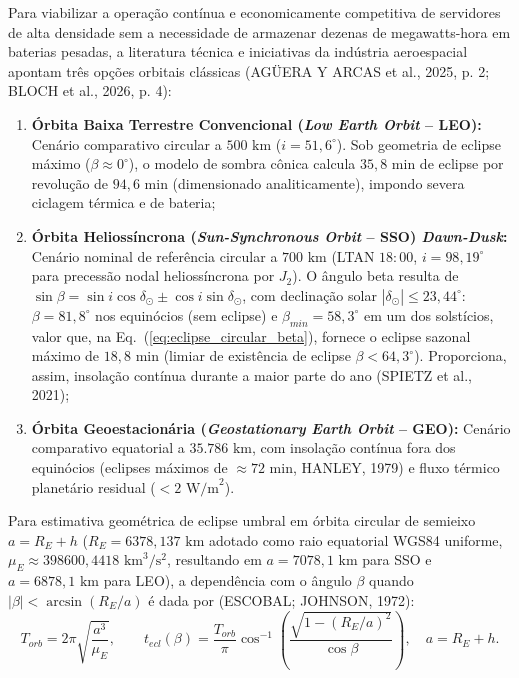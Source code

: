 Para viabilizar a operação contínua e economicamente competitiva de servidores de alta densidade sem a necessidade de armazenar dezenas de megawatts-hora em baterias pesadas, a literatura técnica e iniciativas da indústria aeroespacial apontam três opções orbitais clássicas (AGÜERA Y ARCAS et al., 2025, p. 2; BLOCH et al., 2026, p. 4):
\begin{enumerate}[label=(\alph*)]
    \item \textbf{Órbita Baixa Terrestre Convencional (\textit{Low Earth Orbit} -- LEO):} Cenário comparativo circular a $500\text{ km}$ ($i=51{,}6^\circ$). Sob geometria de eclipse máximo ($\beta \approx 0^\circ$), o modelo de sombra cônica calcula $35{,}8\text{ min}$ de eclipse por revolução de $94{,}6\text{ min}$ (dimensionado analiticamente), impondo severa ciclagem térmica e de bateria;
    \item \textbf{Órbita Heliossíncrona (\textit{Sun-Synchronous Orbit} -- SSO) \textit{Dawn-Dusk}:} Cenário nominal de referência circular a $700\text{ km}$ (LTAN $18{:}00$, $i=98{,}19^\circ$ para precessão nodal heliossíncrona por $J_2$). O ângulo beta resulta de $\sin\beta = \sin i\cos\delta_\odot \pm \cos i\sin\delta_\odot$, com declinação solar $|\delta_\odot|\le 23{,}44^\circ$: $\beta = 81{,}8^\circ$ nos equinócios (sem eclipse) e $\beta_{min} = 58{,}3^\circ$ em um dos solstícios, valor que, na Eq.~(\ref{eq:eclipse_circular_beta}), fornece o eclipse sazonal máximo de $18{,}8\text{ min}$ (limiar de existência de eclipse $\beta<64{,}3^\circ$). Proporciona, assim, insolação contínua durante a maior parte do ano (SPIETZ et al., 2021);
    \item \textbf{Órbita Geoestacionária (\textit{Geostationary Earth Orbit} -- GEO):} Cenário comparativo equatorial a $35.786\text{ km}$, com insolação contínua fora dos equinócios (eclipses máximos de $\approx 72\text{ min}$, HANLEY, 1979) e fluxo térmico planetário residual ($< 2\text{ W/m}^2$).
\end{enumerate}

Para estimativa geométrica de eclipse umbral em órbita circular de semieixo $a = R_E + h$ ($R_E=6378{,}137\text{ km}$ adotado como raio equatorial WGS84 uniforme, $\mu_E\approx 398600{,}4418\text{ km}^3/\text{s}^2$, resultando em $a=7078{,}1\text{ km}$ para SSO e $a=6878{,}1\text{ km}$ para LEO), a dependência com o ângulo $\beta$ quando $|\beta| < \arcsin(R_E/a)$ é dada por (ESCOBAL; JOHNSON, 1972):
\begin{equation}
    T_{orb}=2\pi\sqrt{\frac{a^3}{\mu_E}}, \qquad
    t_{ecl}(\beta)=\frac{T_{orb}}{\pi}\cos^{-1}\!\left(\frac{\sqrt{1-(R_E/a)^2}}{\cos\beta}\right), \quad a=R_E+h.
    \label{eq:eclipse_circular_beta}
\end{equation}

